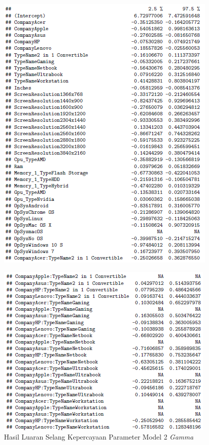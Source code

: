 \documentclass[12pt]{article}
\begin{document}
\begin{figure}[h!]
    \centering
    \includegraphics{Model_3_CI(1_5).png}
    \label{fig:CI31}
\end{figure}
\begin{figure}[h!]
    \centering
    \includegraphics{Model_3_CI(2_5).png}
    \caption{Hasil Luaran Selang Kepercayaan Parameter Model 2 \textit{Gamma}}
    \label{fig:CI32}
\end{figure}
\end{document}
